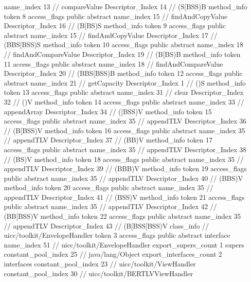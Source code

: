 {{{{{					name_index	13		// compareValue
					Descriptor_Index	14		// (S[BSS)B
				}
				method_info {
					token	8
					access_flags	public abstract
					name_index	15		// findAndCopyValue
					Descriptor_Index	16		// (B[BS)S
				}
				method_info {
					token	9
					access_flags	public abstract
					name_index	15		// findAndCopyValue
					Descriptor_Index	17		// (BBS[BSS)S
				}
				method_info {
					token	10
					access_flags	public abstract
					name_index	18		// findAndCompareValue
					Descriptor_Index	19		// (B[BS)B
				}
				method_info {
					token	11
					access_flags	public abstract
					name_index	18		// findAndCompareValue
					Descriptor_Index	20		// (BBS[BSS)B
				}
				method_info {
					token	12
					access_flags	public abstract
					name_index	21		// getCapacity
					Descriptor_Index	1		// ()S
				}
				method_info {
					token	13
					access_flags	public abstract
					name_index	31		// clear
					Descriptor_Index	32		// ()V
				}
				method_info {
					token	14
					access_flags	public abstract
					name_index	33		// appendArray
					Descriptor_Index	34		// ([BSS)V
				}
				method_info {
					token	15
					access_flags	public abstract
					name_index	35		// appendTLV
					Descriptor_Index	36		// (B[BSS)V
				}
				method_info {
					token	16
					access_flags	public abstract
					name_index	35		// appendTLV
					Descriptor_Index	37		// (BB)V
				}
				method_info {
					token	17
					access_flags	public abstract
					name_index	35		// appendTLV
					Descriptor_Index	38		// (BS)V
				}
				method_info {
					token	18
					access_flags	public abstract
					name_index	35		// appendTLV
					Descriptor_Index	39		// (BBB)V
				}
				method_info {
					token	19
					access_flags	public abstract
					name_index	35		// appendTLV
					Descriptor_Index	40		// (BBS)V
				}
				method_info {
					token	20
					access_flags	public abstract
					name_index	35		// appendTLV
					Descriptor_Index	41		// (BSS)V
				}
				method_info {
					token	21
					access_flags	public abstract
					name_index	35		// appendTLV
					Descriptor_Index	42		// (BB[BSS)V
				}
				method_info {
					token	22
					access_flags	public abstract
					name_index	35		// appendTLV
					Descriptor_Index	43		// (B[BSS[BSS)V
				}
			}
		}
		class_info {		// uicc/toolkit/EnvelopeHandler
			token	3
			access_flags	public abstract interface
			name_index	51		// uicc/toolkit/EnvelopeHandler
			export_supers_count	1
			supers {
				constant_pool_index	25		// java/lang/Object
			}
			export_interfaces_count	2
			interfaces {
				constant_pool_index	23		// uicc/toolkit/ViewHandler
				constant_pool_index	30		// uicc/toolkit/BERTLVViewHandler
}}}}
